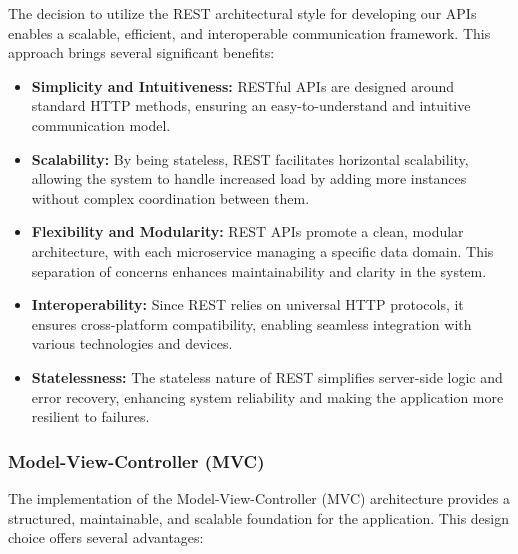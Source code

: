 The decision to utilize the REST architectural style for developing our APIs enables a scalable, efficient, and interoperable communication framework. This approach brings several significant benefits:

\begin{itemize}
    \item \textbf{Simplicity and Intuitiveness:} RESTful APIs are designed around standard HTTP methods, ensuring an easy-to-understand and intuitive communication model.
    \item \textbf{Scalability:} By being stateless, REST facilitates horizontal scalability, allowing the system to handle increased load by adding more instances without complex coordination between them.
    \item \textbf{Flexibility and Modularity:} REST APIs promote a clean, modular architecture, with each microservice managing a specific data domain. This separation of concerns enhances maintainability and clarity in the system.
    \item \textbf{Interoperability:} Since REST relies on universal HTTP protocols, it ensures cross-platform compatibility, enabling seamless integration with various technologies and devices.
    \item \textbf{Statelessness:} The stateless nature of REST simplifies server-side logic and error recovery, enhancing system reliability and making the application more resilient to failures.
\end{itemize}

\subsubsection{Model-View-Controller (MVC)}

The implementation of the Model-View-Controller (MVC) architecture provides a structured, maintainable, and scalable foundation for the application. This design choice offers several advantages:

